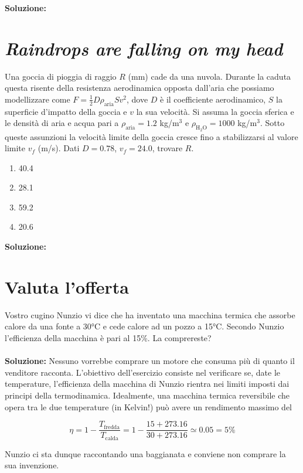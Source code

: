 \noindent \textbf{Soluzione:}


\section{\textit{Raindrops are falling on my head}}
Una goccia di pioggia di raggio $R$ (mm)
cade da una nuvola. Durante la caduta
questa risente della resistenza aerodinamica
opposta dall'aria che possiamo modellizzare
come $F = \frac12 D \rho_\text{aria} S v^2$,
dove $D$ è il coefficiente aerodinamico,
$S$ la superficie d'impatto della goccia e
$v$ la sua velocità. Si assuma la goccia
sferica e le densità di aria e acqua pari a
$\rho_\text{aria} = 1.2$ kg/m$^3$ e
$\rho_\text{H$_2$O} = 1000$ kg/m$^3$. Sotto
queste assunzioni la velocità limite della
goccia cresce fino a stabilizzarsi al
valore limite $v_f$ (m/s). Dati $D = 0.78$,
$v_f = 24.0$, trovare $R$.

\begin{enumerate}
    \item 40.4
    \item 28.1
    \item 59.2
    \item 20.6
\end{enumerate}

\noindent \textbf{Soluzione:}

\section{Valuta l'offerta}
Vostro cugino Nunzio vi dice che ha inventato una macchina termica che assorbe
calore da una fonte a 30°C e cede calore ad un pozzo a 15°C. Secondo Nunzio
l'efficienza della macchina è pari al 15\%. La comprereste?
\\\\
\noindent \textbf{Soluzione:} Nessuno vorrebbe comprare un motore che
consuma più di quanto il venditore racconta. L'obiettivo dell'esercizio consiste
nel verificare se, date le temperature, l'efficienza della macchina
di Nunzio rientra nei limiti imposti dai principi della termodinamica.
Idealmente, una macchina termica reversibile che opera
tra le due temperature (in Kelvin!) può avere un rendimento massimo del

\[ \eta = 1 - \frac{T_\text{fredda}}{T_\text{calda}} = 1 - \frac{15 + 273.16}{30 + 273.16} \simeq 0.05 = 5\% \]

\noindent Nunzio ci sta dunque raccontando una baggianata e conviene non comprare la sua
invenzione.